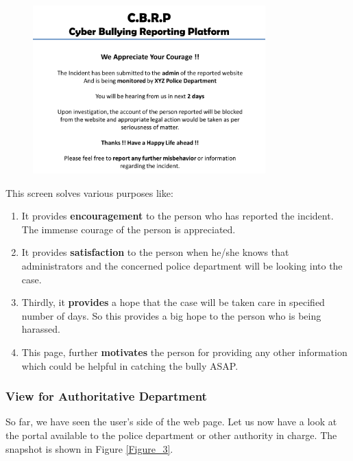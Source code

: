 \begin{figure}[h]
\centering
\includegraphics[width=0.8\textwidth]{images/Figure_2}
\caption{}
\label{Figure_2}
\end{figure}



This screen solves various purposes like:
\begin{enumerate}

\item
It provides \textbf{encouragement} to the person who has reported the incident. The immense courage of the person is appreciated. 
\item
It provides \textbf{satisfaction} to the person when he/she knows that administrators and the concerned police department will be looking into the case.
\item
Thirdly, it \textbf{provides} a hope that the case will be taken care in specified number of days. So this provides a big hope to the person who is being harassed.
\item
This page, further \textbf{motivates} the person for providing any other information which could be helpful in catching the bully ASAP.
\end{enumerate}

\subsubsection{View for Authoritative Department}
So far, we have seen the user’s side of the web page. Let us now have a look at the portal available to the police department or other authority in charge. The snapshot is shown in Figure \ref{Figure_3}.


